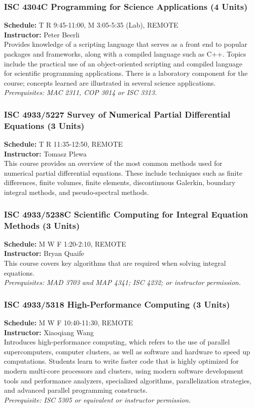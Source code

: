 \documentclass[12pt,a4paper]{article}
\begin{document}
\subsubsection*{ISC 4304C Programming for Science Applications (4 Units)}
\textbf{Schedule:} T R 9:45-11:00, M 3:05-5:35 (Lab), REMOTE \\
\textbf{Instructor:} Peter Beerli \\
Provides knowledge of a scripting language that serves as a front end to popular packages and frameworks, along with a compiled language such as C++. Topics include the practical use of an object-oriented scripting and compiled language for scientific programming applications. There is a laboratory component for the course; concepts learned are illustrated in several science applications. \\
\textit{Prerequisites: MAC 2311, COP 3014 or ISC 3313.}

\subsubsection*{ISC 4933/5227 Survey of Numerical Partial Differential Equations (3 Units)}
\textbf{Schedule:} T R 11:35-12:50, REMOTE \\
\textbf{Instructor:} Tomasz Plewa \\
This course provides an overview of the most common methods used for numerical partial differential equations. These include techniques such as finite differences, finite volumes, finite elements, discontinuous Galerkin, boundary integral methods, and pseudo-spectral methods.

\subsubsection*{ISC 4933/5238C Scientific Computing for Integral Equation Methods (3 Units)}
\textbf{Schedule:} M W F 1:20-2:10, REMOTE \\
\textbf{Instructor:} Bryan Quaife \\
This course covers key algorithms that are required when solving integral equations. \\
\textit{Prerequisites: MAD 3703 and MAP 4341; ISC 4232; or instructor permission.}

\subsubsection*{ISC 4933/5318 High-Performance Computing (3 Units)}
\textbf{Schedule:} M W F 10:40-11:30, REMOTE \\
\textbf{Instructor:} Xiaoqiang Wang \\
Introduces high-performance computing, which refers to the use of parallel supercomputers, computer clusters, as well as software and hardware to speed up computations. Students learn to write faster code that is highly optimized for modern multi-core processors and clusters, using modern software development tools and performance analyzers, specialized algorithms, parallelization strategies, and advanced parallel programming constructs. \\
\textit{Prerequisite: ISC 5305 or equivalent or instructor permission.}
\end{document}
